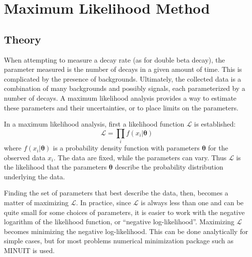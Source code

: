 \documentclass[herrin-thesis.tex]{subfiles}
\begin{document}
\section{Maximum Likelihood Method}
\subsection{Theory}
\label{sec:analysis_ml_theory}
When attempting to measure a decay rate (as for double beta decay), the parameter measured is the number of decays in a given amount of time. This is complicated by the presence of backgrounds. Ultimately, the collected data is a combination of many backgrounds and possibly signals, each parameterized by a number of decays. A maximum likelihood analysis provides a way to estimate these parameters and their uncertainties, or to place limits on the parameters.

In a maximum likelihood analysis, first a likelihood function \(\mathcal{L}\) is established:
\begin{equation}
\mathcal{L} = \prod_i f(x_i|\boldsymbol{\theta})
\end{equation}
where \(f(x_i|\boldsymbol{\theta})\) is a probability density function with parameters \(\boldsymbol{\theta}\) for the observed data \(x_i\). The data are fixed, while the parameters can vary. Thus \(\mathcal{L}\) is the likelihood that the parameters \(\boldsymbol{\theta}\) describe the probability distribution underlying the data.

Finding the set of parameters that best describe the data, then, becomes a matter of maximizing \(\mathcal{L}\). In practice, since \(\mathcal{L}\) is always less than one and can be quite small for some choices of parameters, it is easier to work with the negative logarithm of the likelihood function, or ``negative log-likelihood''. Maximizing \(\mathcal{L}\) becomes minimizing the negative log-likelihood. This can be done analytically for simple cases, but for most problems numerical minimization package such as MINUIT\cite{James:1975kx} is used.
\end{document}
